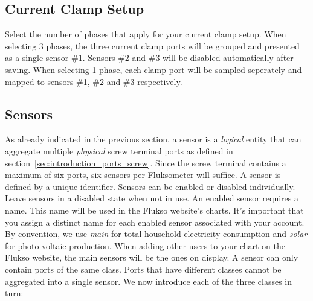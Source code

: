 \subsection{Current Clamp Setup}
Select the number of phases that apply for your current clamp setup. When selecting 3 phases, the three current clamp ports will be grouped and presented as a single sensor \#1. Sensors \#2 and \#3 will be disabled automatically after saving. When selecting 1 phase, each clamp port will be sampled seperately and mapped to sensors \#1, \#2 and \#3 respectively.

\subsection{Sensors}
As already indicated in the previous section, a sensor is a \emph{logical} entity that can aggregate multiple \emph{physical} screw terminal ports as defined in section~\ref{sec:introduction_ports_screw}. Since the screw terminal contains a maximum of six ports, six sensors per Fluksometer will suffice. A sensor is defined by a unique identifier. Sensors can be enabled or disabled individually. Leave sensors in a disabled state when not in use. An enabled sensor requires a name. This name will be used in the Flukso website's charts. It's important that you assign a distinct name for each enabled sensor associated with your account. By convention, we use \emph{main} for total household electricity consumption and \emph{solar} for photo-voltaic production. When adding other users to your chart on the Flukso website, the main sensors will be the ones on display. A sensor can only contain ports of the same class. Ports that have different classes cannot be aggregated into a single sensor. We now introduce each of the three classes in turn:

